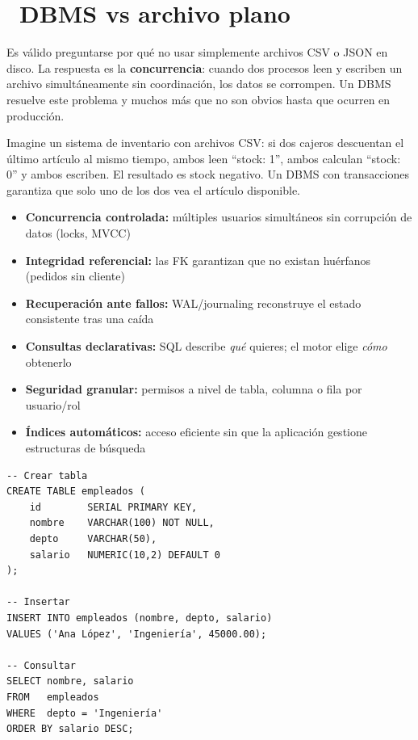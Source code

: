 \section[DBMS vs archivo plano]{~DBMS vs archivo plano}

Es válido preguntarse por qué no usar simplemente archivos CSV o JSON en disco.
La respuesta es la \textbf{concurrencia}: cuando dos procesos leen y escriben un archivo simultáneamente sin coordinación, los datos se corrompen.
Un DBMS resuelve este problema y muchos más que no son obvios hasta que ocurren en producción.

Imagine un sistema de inventario con archivos CSV: si dos cajeros descuentan el último artículo al mismo tiempo, ambos leen ``stock: 1'', ambos calculan ``stock: 0'' y ambos escriben. El resultado es stock negativo.
Un DBMS con transacciones garantiza que solo uno de los dos vea el artículo disponible.

\begin{itemize}
  \item \textbf{Concurrencia controlada:} múltiples usuarios simultáneos sin corrupción de datos (locks, MVCC)
  \item \textbf{Integridad referencial:} las FK garantizan que no existan huérfanos (pedidos sin cliente)
  \item \textbf{Recuperación ante fallos:} WAL/journaling reconstruye el estado consistente tras una caída
  \item \textbf{Consultas declarativas:} SQL describe \emph{qué} quieres; el motor elige \emph{cómo} obtenerlo
  \item \textbf{Seguridad granular:} permisos a nivel de tabla, columna o fila por usuario/rol
  \item \textbf{Índices automáticos:} acceso eficiente sin que la aplicación gestione estructuras de búsqueda
\end{itemize}

\begin{lstlisting}[caption={DDL + DML básico}]
-- Crear tabla
CREATE TABLE empleados (
    id        SERIAL PRIMARY KEY,
    nombre    VARCHAR(100) NOT NULL,
    depto     VARCHAR(50),
    salario   NUMERIC(10,2) DEFAULT 0
);

-- Insertar
INSERT INTO empleados (nombre, depto, salario)
VALUES ('Ana López', 'Ingeniería', 45000.00);

-- Consultar
SELECT nombre, salario
FROM   empleados
WHERE  depto = 'Ingeniería'
ORDER BY salario DESC;
\end{lstlisting}


